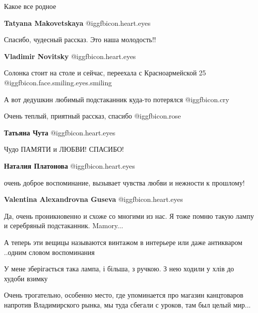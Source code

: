 \begin{itemize}
Какое все родное

\textbf{Tatyana Makovetskaya}  @igg{fbicon.heart.eyes} 

Спасибо, чудесный рассказ. Это наша молодость!!

\textbf{Vladimir Novitsky}  @igg{fbicon.heart.eyes} 

Солонка стоит на столе и сейчас, переехала с Красноармейской 25 @igg{fbicon.face.smiling.eyes.smiling} 

А вот дедушкин любимый подстаканник куда-то потерялся  @igg{fbicon.cry} 

Очень теплый, приятный рассказ, спасибо @igg{fbicon.rose} 

\textbf{Татьяна Чута}  @igg{fbicon.heart.eyes} 

Чудо ПАМЯТИ и ЛЮБВИ! СПАСИБО!

\textbf{Наталия Платонова}  @igg{fbicon.heart.eyes} 

очень доброе воспоминание, вызывает чувства любви и нежности к прошлому!

\textbf{Valentina Alexandrovna Guseva}  @igg{fbicon.heart.eyes} 

Да, очень проникновенно и схоже со многими из нас. Я тоже помню такую лампу и
серебряный подстаканник. Mamory...

А теперь эти вещицы называются винтажом в интерьере или даже антикваром ..одним
словом воспоминания


У мене зберігається така лампа, і більша, з ручкою. З нею ходили у хлів до
худоби взимку


Очень трогательно, особенно место, где упоминается про магазин канцтоваров
напротив Владимирского рынка, мы туда сбегали с уроков, там был целый мир...



\end{itemize} %


